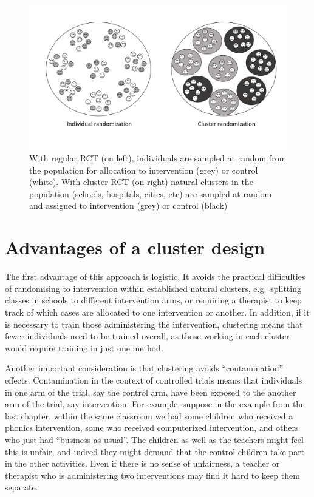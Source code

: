 \documentclass{krantz}
\begin{document}
\begin{center}
\begin{figure}
\includegraphics[width=0.6\linewidth]{images_bw/clusterdemo} \caption{With regular RCT (on left), individuals are sampled at random from the population for allocation to intervention (grey) or control (white).  With cluster RCT (on right) natural clusters in the population (schools, hospitals, cities, etc) are sampled at random and assigned to intervention (grey) or control (black)}\label{fig:cluster-diag}
\end{figure}
\end{center}

\hypertarget{advantages-of-a-cluster-design}{%
\section{Advantages of a cluster design}\label{advantages-of-a-cluster-design}}

The first advantage of this approach is logistic. It avoids the practical difficulties of randomising to intervention within established natural clusters, e.g.~splitting classes in schools to different intervention arms, or requiring a therapist to keep track of which cases are allocated to one intervention or another. In addition, if it is necessary to train those administering the intervention, clustering means that fewer individuals need to be trained overall, as those working in each cluster would require training in just one method.

Another important consideration is that clustering avoids ``contamination'' effects. Contamination in the context of controlled trials means that individuals in one arm of the trial, say the control arm, have been exposed to the another arm of the trial, say intervention. For example, suppose in the example from the last chapter, within the same classroom we had some children who received a phonics intervention, some who received computerized intervention, and others who just had ``business as usual''. The children as well as the teachers might feel this is unfair, and indeed they might demand that the control children take part in the other activities. Even if there is no sense of unfairness, a teacher or therapist who is administering two interventions may find it hard to keep them separate.
\end{document}
